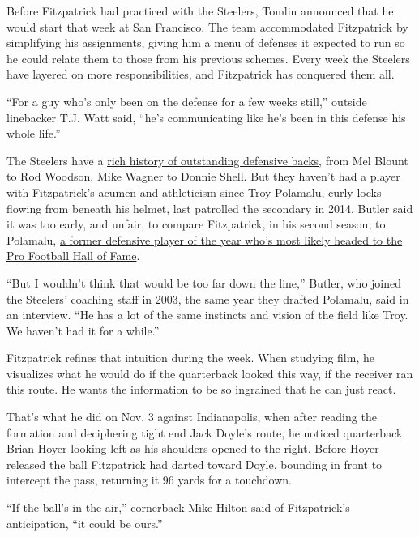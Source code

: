 Before Fitzpatrick had practiced with the Steelers, Tomlin announced
that he would start that week at San Francisco. The team accommodated
Fitzpatrick by simplifying his assignments, giving him a menu of
defenses it expected to run so he could relate them to those from his
previous schemes. Every week the Steelers have layered on more
responsibilities, and Fitzpatrick has conquered them all.

``For a guy who's only been on the defense for a few weeks still,''
outside linebacker T.J. Watt said, ``he's communicating like he's been
in this defense his whole life.''

The Steelers have a
\href{https://steelerswire.usatoday.com/2019/07/13/ranking-the-7-best-defensive-backs-in-steelers-history/}{rich
history of outstanding defensive backs}, from Mel Blount to Rod Woodson,
Mike Wagner to Donnie Shell. But they haven't had a player with
Fitzpatrick's acumen and athleticism since Troy Polamalu, curly locks
flowing from beneath his helmet, last patrolled the secondary in 2014.
Butler said it was too early, and unfair, to compare Fitzpatrick, in his
second season, to Polamalu,
\href{https://www.nytimes3xbfgragh.onion/2005/01/20/sports/football/polamalu-dances-with-fire-just-not-in-the-end-zone.html}{a
former defensive player of the year who's most likely headed to the Pro
Football Hall of Fame}.

``But I wouldn't think that would be too far down the line,'' Butler,
who joined the Steelers' coaching staff in 2003, the same year they
drafted Polamalu, said in an interview. ``He has a lot of the same
instincts and vision of the field like Troy. We haven't had it for a
while.''

Fitzpatrick refines that intuition during the week. When studying film,
he visualizes what he would do if the quarterback looked this way, if
the receiver ran this route. He wants the information to be so ingrained
that he can just react.

That's what he did on Nov. 3 against Indianapolis, when after reading
the formation and deciphering tight end Jack Doyle's route, he noticed
quarterback Brian Hoyer looking left as his shoulders opened to the
right. Before Hoyer released the ball Fitzpatrick had darted toward
Doyle, bounding in front to intercept the pass, returning it 96 yards
for a touchdown.

``If the ball's in the air,'' cornerback Mike Hilton said of
Fitzpatrick's anticipation, ``it could be ours.''

